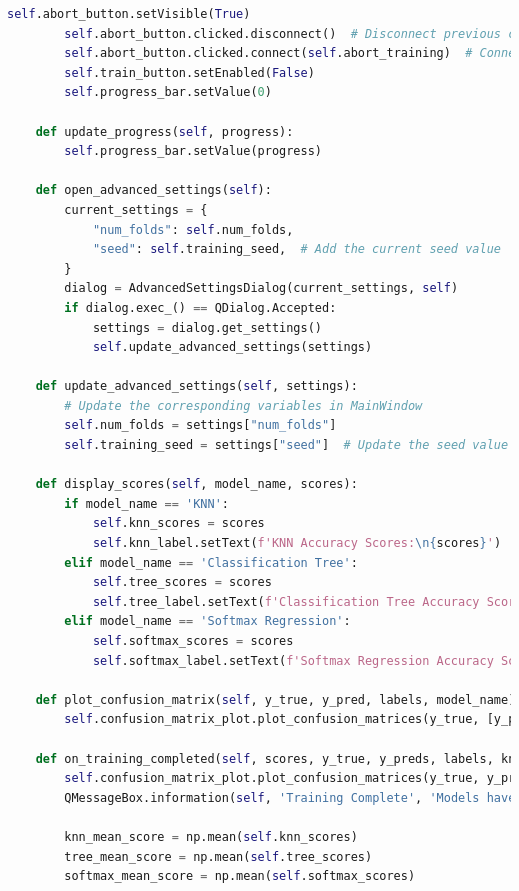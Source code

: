 \documentclass[letterpaper,10pt]{article}
\begin{document}
\begin{lstlisting}[language=Python, caption=ui.py - Final structure after refactoring. ]
        self.abort_button.setVisible(True)
        self.abort_button.clicked.disconnect()  # Disconnect previous connection
        self.abort_button.clicked.connect(self.abort_training)  # Connect abort button to training abort
        self.train_button.setEnabled(False)
        self.progress_bar.setValue(0)
    
    def update_progress(self, progress):
        self.progress_bar.setValue(progress)
    
    def open_advanced_settings(self):
        current_settings = {
            "num_folds": self.num_folds,
            "seed": self.training_seed,  # Add the current seed value
        }
        dialog = AdvancedSettingsDialog(current_settings, self)
        if dialog.exec_() == QDialog.Accepted:
            settings = dialog.get_settings()
            self.update_advanced_settings(settings)

    def update_advanced_settings(self, settings):
        # Update the corresponding variables in MainWindow
        self.num_folds = settings["num_folds"]
        self.training_seed = settings["seed"]  # Update the seed value
    
    def display_scores(self, model_name, scores):
        if model_name == 'KNN':
            self.knn_scores = scores
            self.knn_label.setText(f'KNN Accuracy Scores:\n{scores}')
        elif model_name == 'Classification Tree':
            self.tree_scores = scores
            self.tree_label.setText(f'Classification Tree Accuracy Scores:\n{scores}')
        elif model_name == 'Softmax Regression':
            self.softmax_scores = scores
            self.softmax_label.setText(f'Softmax Regression Accuracy Scores:\n{scores}')
    
    def plot_confusion_matrix(self, y_true, y_pred, labels, model_name):
        self.confusion_matrix_plot.plot_confusion_matrices(y_true, [y_pred], labels, [model_name])
    
    def on_training_completed(self, scores, y_true, y_preds, labels, knn_metrics, tree_metrics, softmax_metrics):
        self.confusion_matrix_plot.plot_confusion_matrices(y_true, y_preds, labels, ['KNN', 'Classification Tree', 'Softmax Regression'])
        QMessageBox.information(self, 'Training Complete', 'Models have been trained successfully.')
        
        knn_mean_score = np.mean(self.knn_scores)
        tree_mean_score = np.mean(self.tree_scores)
        softmax_mean_score = np.mean(self.softmax_scores)
        

\end{lstlisting}
\end{document}
